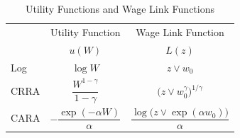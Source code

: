 \begin{table}[ht]
    \centering
    \caption{Utility Functions and Wage Link Functions}
    \label{tab:utility_functions}
    \renewcommand{\arraystretch}{1.5}
    \setlength{\tabcolsep}{6pt}
    \small
    \begin{tabular*}{\textwidth}{@{\extracolsep{\fill}}lcc}
        \toprule
        & \multicolumn{1}{c}{Utility Function}
        & \multicolumn{1}{c}{Wage Link Function} \\
        & \(u(W)\) & \(L(z)\) \\
        \midrule
        Log
        & \(\log W\)
        & \(z\vee w_0\) \\
        CRRA
        & \(\dfrac{W^{1-\gamma}}{1-\gamma}\)
        & \(\bigl(z\vee w_0^\gamma\bigr)^{1/\gamma}\) \\
        CARA
        & \(-\dfrac{\exp(-\alpha W)}{\alpha}\)
        & \(\dfrac{\log\bigl(z\vee\exp(\alpha w_0)\bigr)}{\alpha}\) \\
        \bottomrule
    \end{tabular*}
\end{table}
